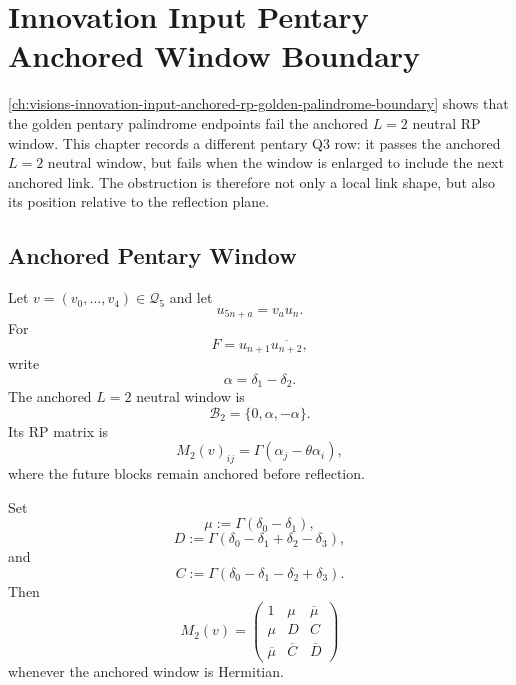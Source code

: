 \chapter{Innovation Input Pentary Anchored Window Boundary}
\label{ch:visions-innovation-input-pentary-anchored-window-boundary}

\autoref{ch:visions-innovation-input-anchored-rp-golden-palindrome-boundary}
shows that the golden pentary palindrome endpoints fail the anchored
$L=2$ neutral RP window. This chapter records a different pentary Q3 row:
it passes the anchored $L=2$ neutral window, but fails when the window is
enlarged to include the next anchored link. The obstruction is therefore
not only a local link shape, but also its position relative to the
reflection plane.

\section{Anchored Pentary Window}
\label{sec:innovation-input-pentary-anchored-window}

\begin{definition}[Pentary anchored $L=2$ window]
\label{def:innovation-input-pentary-anchored-ltwo-window}
Let $v=(v_0,\ldots,v_4)\in\mathcal Q_5$ and let
$$
u_{5n+a}=v_a u_n.
$$
For
$$
F=u_{n+1}\overline{u_{n+2}},
$$
write
$$
\alpha=\delta_1-\delta_2.
$$
The anchored $L=2$ neutral window is
$$
\mathcal B_2=\{0,\alpha,-\alpha\}.
$$
Its RP matrix is
$$
M_2(v)_{ij}=\Gamma(\alpha_j-\theta\alpha_i),
$$
where the future blocks remain anchored before reflection.
\end{definition}

\begin{definition}[Anchored $L=2$ structure quantities]
\label{def:innovation-input-pentary-ltwo-structure-quantities}
Set
$$
\mu:=\Gamma(\delta_0-\delta_1),
$$
$$
D:=\Gamma(\delta_0-\delta_1+\delta_2-\delta_3),
$$
and
$$
C:=\Gamma(\delta_0-\delta_1-\delta_2+\delta_3).
$$
Then
$$
M_2(v)=
\left(
\begin{array}{ccc}
1 & \mu & \overline{\mu}\\
\mu & D & C\\
\overline{\mu} & \overline C & \overline D
\end{array}
\right)
$$
whenever the anchored window is Hermitian.
\end{definition}

